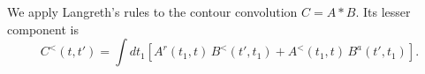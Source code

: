 \documentclass{article}
\begin{document}
We apply Langreth's rules to the contour convolution $C = A * B$. Its lesser component is
\begin{equation}
C^{<}(t,t') = \int dt_1 \left[ A^{r}(t_1,t)\, B^{<}(t',t_1) + A^{<}(t_1,t)\, B^{a}(t',t_1) \right] .
\label{eq:lang}
\end{equation}
\end{document}
